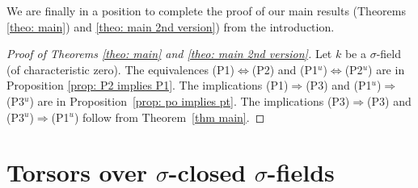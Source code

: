 \documentclass[oneside,reqno]{amsart}
\theoremstyle{definition}
\newcommand{\s}{\sigma}
\newcommand{\po}{{\rm{(P1$^u$)}}}
\newcommand{\pt}{{\rm{(P3$^u$)}}}
\newcommand{\pw}{{\rm{(P2$^u$)}}}
\newcommand{\poweak}{{\rm{(P1)}}}
\newcommand{\ptweak}{{\rm{(P3)}}}
\newcommand{\pwweak}{{\rm{(P2)}}}
\begin{document}
We are finally in a position to complete the proof of our main results (Theorems \ref{theo: main}) and \ref{theo: main 2nd version}) from the introduction.

\medskip

\begin{proof}[Proof of Theorems \ref{theo: main} and \ref{theo: main 2nd version}]
Let $k$ be a $\s$-field (of characteristic zero). The equivalences \poweak{}$\Leftrightarrow$\pwweak{} and \po{}$\Leftrightarrow$\pw{} are in Proposition \ref{prop: P2 implies P1}. The implications \poweak{}$\Rightarrow$\ptweak{} and \po{}$\Rightarrow$\pt{} are in Proposition~\ref{prop: po implies pt}. The implications \ptweak{}$\Rightarrow$\ptweak{} and \pt{}$\Rightarrow$\po{} follow from Theorem~\ref{thm main}.
\end{proof}

%
%







\section{Torsors over $\s$-closed $\s$-fields}
\label{sec: Torsors over sclosed sfields}
\end{document}
